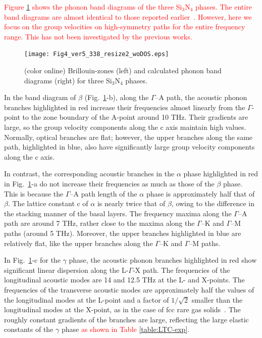 \documentclass[twocolumn,amsmath,amssymb,a4paper,prb,superscriptaddress,floatfix]{revtex4-1}
\begin{document}
\textcolor{red}{Figure \ref{fig:Fig4_ver5_338} shows the phonon band diagrams 
of the three Si$_3$N$_4$ phases.
The entire band diagrams are almost identical to those reported earlier~\cite{kuwabara,xu}.
However, here we focus on the group velocities on high-symmetry paths for the 
entire frequency range. This has not been investigated by the previous works. 
}

\begin{figure}[ht]
 \begin{center}
  \texttt{[image: Fig4\_ver5\_338\_resize2\_woDOS.eps]}
  \caption{(color online) Brillouin-zones (left) and calculated phonon band diagrams (right) for three Si$_3$N$_4$ phases.
  \label{fig:Fig4_ver5_338} }
 \end{center}
\end{figure}

In the band diagram of $\beta$ (Fig.~\ref{fig:Fig4_ver5_338}-b), along
the $\Gamma$--A path, the acoustic phonon branches highlighted in red
increase their frequencies almost linearly from the $\Gamma$-point to
the zone boundary of the A-point around 10 THz. Their gradients are
large, so the group velocity components along the c axis maintain high
values. Normally, optical branches are flat; however, the upper branches
along the same path, highlighted in blue, also have significantly large
group velocity components along the c axis.

In contrast, the corresponding acoustic branches in the $\alpha$ phase
highlighted in red in Fig.~\ref{fig:Fig4_ver5_338}-a do not increase
their frequencies as much as those of the $\beta$ phase. This is because
the $\Gamma$--A path length of the $\alpha$ phase is approximately half
that of $\beta$. The lattice constant c of $\alpha$ is nearly twice that
of $\beta$, owing to the difference in the stacking manner of the basal
layers. The frequency maxima along the $\Gamma$--A path are around 7 THz,
rather close to the maxima along the $\Gamma$--K and $\Gamma$--M paths
(around 5 THz). Moreover, the upper branches highlighted in blue are
relatively flat, like the upper branches along the $\Gamma$--K and
$\Gamma$--M paths.

In Fig.~\ref{fig:Fig4_ver5_338}-c for the $\gamma$ phase, the acoustic phonon branches
highlighted in red show significant linear dispersion along the
L-$\Gamma$-X path. The frequencies of the longitudinal acoustic modes
are 14 and 12.5 THz at the L- and X-points. The frequencies of the
transverse acoustic modes are approximately half the values of the
longitudinal modes at the L-point and a factor of $1/\sqrt{2}$ smaller
than the longitudinal modes at the X-point, as in the case of fcc rare
gas solids~\cite{dove-p30}. The roughly constant gradients of the branches are large,
reflecting the large elastic constants of the $\gamma$ phase
\textcolor{red}{as shown in Table \ref{table:LTC-exp}.} 
%
\end{document}
